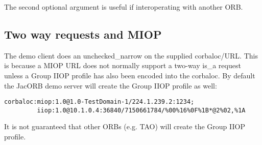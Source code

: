 The second optional argument is useful if interoperating with another ORB.

\subsection{Two way requests and MIOP}
The demo client does an unchecked\_narrow on the supplied corbaloc/URL. This is
because a MIOP URL does not normally support a two-way is\_a request unless a
Group IIOP profile has also been encoded into the corbaloc. By default the
JacORB demo server will create the Group IIOP profile as well:

\begin{verbatim}
corbaloc:miop:1.0@1.0-TestDomain-1/224.1.239.2:1234;
         iiop:1.0@10.1.0.4:36840/7150661784/%00%16%0F%1B*@2%02,%1A
\end{verbatim}

It is not guaranteed that other ORBs (e.g. TAO) will create the Group IIOP
profile.
